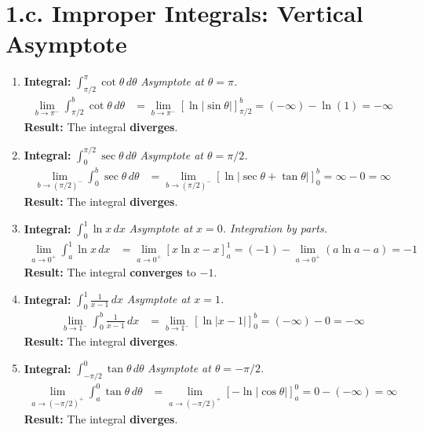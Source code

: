 \documentclass[12pt]{article}
\newcommand{\problemsettitle}[1]{\section*{#1}}
\begin{document}
\newpage
\problemsettitle{1.c. Improper Integrals: Vertical Asymptote}
\begin{enumerate}
    \item \textbf{Integral: } $\displaystyle \int_{\pi/2}^{\pi} \cot\theta \,d\theta$
    \textit{Asymptote at $\theta=\pi$.}
    \begin{align*}
        \lim_{b \to \pi^-} \int_{\pi/2}^{b} \cot\theta \,d\theta &= \lim_{b \to \pi^-} [\ln|\sin\theta|]_{\pi/2}^b = (-\infty) - \ln(1) = -\infty
    \end{align*}
    \textbf{Result:} The integral \textbf{diverges}.

    \item \textbf{Integral: } $\displaystyle \int_{0}^{\pi/2} \sec\theta \,d\theta$
    \textit{Asymptote at $\theta=\pi/2$.}
    \begin{align*}
        \lim_{b \to (\pi/2)^-} \int_{0}^{b} \sec\theta \,d\theta &= \lim_{b \to (\pi/2)^-} [\ln|\sec\theta+\tan\theta|]_0^b = \infty - 0 = \infty
    \end{align*}
    \textbf{Result:} The integral \textbf{diverges}.

    \item \textbf{Integral: } $\displaystyle \int_{0}^{1} \ln x \,dx$
    \textit{Asymptote at $x=0$. Integration by parts.}
    \begin{align*}
        \lim_{a \to 0^+} \int_{a}^{1} \ln x \,dx &= \lim_{a \to 0^+} [x\ln x - x]_a^1 = (-1) - \lim_{a \to 0^+} (a\ln a - a) = -1
    \end{align*}
    \textbf{Result:} The integral \textbf{converges} to $-1$.

    \item \textbf{Integral: } $\displaystyle \int_{0}^{1} \frac{1}{x-1} \,dx$
    \textit{Asymptote at $x=1$.}
    \begin{align*}
        \lim_{b \to 1^-} \int_{0}^{b} \frac{1}{x-1} \,dx &= \lim_{b \to 1^-} [\ln|x-1|]_0^b = (-\infty) - 0 = -\infty
    \end{align*}
    \textbf{Result:} The integral \textbf{diverges}.

    \item \textbf{Integral: } $\displaystyle \int_{-\pi/2}^{0} \tan\theta \,d\theta$
    \textit{Asymptote at $\theta=-\pi/2$.}
    \begin{align*}
        \lim_{a \to (-\pi/2)^+} \int_{a}^{0} \tan\theta \,d\theta &= \lim_{a \to (-\pi/2)^+} [-\ln|\cos\theta|]_a^0 = 0 - (-\infty) = \infty
    \end{align*}
    \textbf{Result:} The integral \textbf{diverges}.
    

\end{enumerate}
\end{document}
